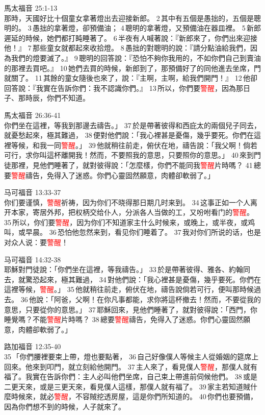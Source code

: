 馬太福音 25:1-13\\
那時，天國好比十個童女拿著燈出去迎接新郎。 2 其中有五個是愚拙的，五個是聰明的。 3 愚拙的拿著燈，卻預備油； 4 聰明的拿著燈，又預備油在器皿裡。 5 新郎遲延的時候，她們都打盹睡著了。 6 半夜有人喊著說：『新郎來了，你們出來迎接他！』 7 那些童女就都起來收拾燈。 8 愚拙的對聰明的說：『請分點油給我們，因為我們的燈要滅了。』 9 聰明的回答說：『恐怕不夠你我用的，不如你們自己到賣油的那裡去買吧。』 10 她們去買的時候，新郎到了，那預備好了的同他進去坐席，門就關了。 11 其餘的童女隨後也來了，說：『主啊，主啊，給我們開門！』 12 他卻回答說：『我實在告訴你們：我不認識你們。』 13 所以，你們要\textcolor{red}{警醒}，因為那日子、那時辰，你們不知道。

馬太福音 26:36-41\\
你們坐在這裡，等我到那邊去禱告。」 37 於是帶著彼得和西庇太的兩個兒子同去，就憂愁起來，極其難過， 38 便對他們說：「我心裡甚是憂傷，幾乎要死。你們在這裡等候，和我一同\textcolor{red}{警醒}。」 39 他就稍往前走，俯伏在地，禱告說：「我父啊！倘若可行，求你叫這杯離開我！然而，不要照我的意思，只要照你的意思。」 40 來到門徒那裡，見他們睡著了，就對彼得說：「怎麼樣，你們不能同我\textcolor{red}{警醒}片時嗎？ 41 總要\textcolor{red}{警醒}禱告，免得入了迷惑。你們心靈固然願意，肉體卻軟弱了。」


马可福音 13:33-37\\
你们要谨慎，\textcolor{red}{警醒}祈祷，因为你们不晓得那日期几时来到。 34 这事正如一个人离开本家，寄居外邦，把权柄交给仆人，分派各人当做的工，又吩咐看门的\textcolor{red}{警醒}。 35 所以，你们要\textcolor{red}{警醒}，因为你们不知道家主什么时候来，或晚上，或半夜，或鸡叫，或早晨。 36 恐怕他忽然来到，看见你们睡着了。 37 我对你们所说的话，也是对众人说：要\textcolor{red}{警醒}！

马可福音 14:32-38\\
耶穌對門徒說：「你們坐在這裡，等我禱告。」 33 於是帶著彼得、雅各、約翰同去，就驚恐起來，極其難過， 34 對他們說：「我心裡甚是憂傷，幾乎要死。你們在這裡等候，\textcolor{red}{警醒}。」 35 他就稍往前走，俯伏在地，禱告說倘若可行，便叫那時候過去。 36 他說：「阿爸，父啊！在你凡事都能，求你將這杯撤去！然而，不要從我的意思，只要從你的意思。」 37 耶穌回來，見他們睡著了，就對彼得說：「西門，你睡覺嗎？不能\textcolor{red}{警醒}片時嗎？ 38 總要\textcolor{red}{警醒}禱告，免得入了迷惑。你們心靈固然願意，肉體卻軟弱了。」

路加福音 12:35-40\\
35 「你們腰裡要束上帶，燈也要點著， 36 自己好像僕人等候主人從婚姻的筵席上回來。他來到叩門，就立刻給他開門。 37 主人來了，看見僕人\textcolor{red}{警醒}，那僕人就有福了。我實在告訴你們：主人必叫他們坐席，自己束上帶進前伺候他們。 38 或是二更天來，或是三更天來，看見僕人這樣，那僕人就有福了。 39 家主若知道賊什麼時候來，就必\textcolor{red}{警醒}，不容賊挖透房屋，這是你們所知道的。 40 你們也要預備，因為你們想不到的時候，人子就來了。

